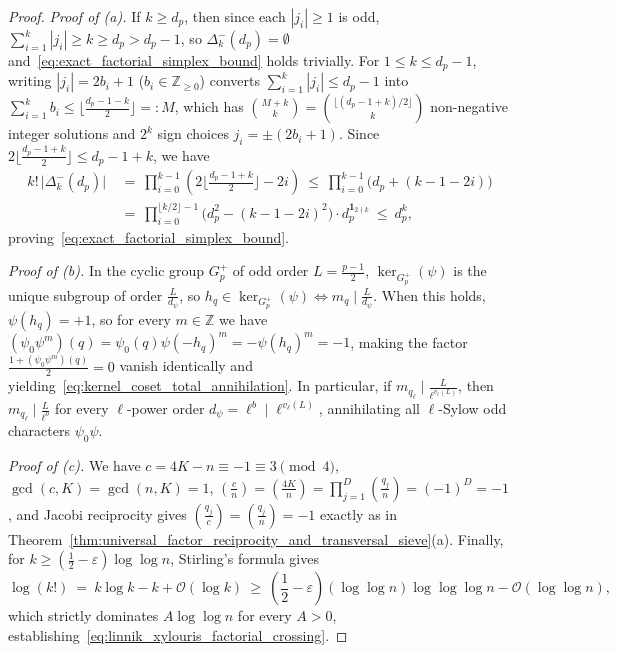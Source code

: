 \documentclass[11pt, a4paper]{article}
\theoremstyle{plain}
\theoremstyle{definition}
\newcommand{\Z}{\mathbb{Z}}
\newcommand{\leg}[2]{\left(\frac{#1}{#2}\right)}
\begin{document}
\begin{proof}
\emph{Proof of (a).} If $k\ge d_p$, then since each $|j_i|\ge1$ is odd, $\sum_{i=1}^{k}|j_i|\ge k\ge d_p>d_p-1$, so $\Delta_k^{-}(d_p)=\emptyset$ and~\eqref{eq:exact_factorial_simplex_bound} holds trivially. For $1\le k\le d_p-1$, writing $|j_i|=2b_i+1$ ($b_i\in\Z_{\ge0}$) converts $\sum_{i=1}^{k}|j_i|\le d_p-1$ into $\sum_{i=1}^{k}b_i\le\big\lfloor\frac{d_p-1-k}{2}\big\rfloor=:M$, which has $\binom{M+k}{k}=\binom{\lfloor(d_p-1+k)/2\rfloor}{k}$ non-negative integer solutions and $2^{k}$ sign choices $j_i=\pm(2b_i+1)$. Since $2\lfloor\frac{d_p-1+k}{2}\rfloor\le d_p-1+k$, we have
\[
\begin{aligned}
k!\,\big|\Delta_k^{-}(d_p)\big|\ &=\ \prod_{i=0}^{k-1}\left(2\Big\lfloor\frac{d_p-1+k}{2}\Big\rfloor-2i\right)\ \le\ \prod_{i=0}^{k-1}\big(d_p+(k-1-2i)\big)\\
&=\ \prod_{i=0}^{\lfloor k/2\rfloor-1}\Big(d_p^{2}-(k-1-2i)^{2}\Big)\cdot d_p^{\mathbf{1}_{2\nmid k}}\ \le\ d_p^{k},
\end{aligned}
\]
proving~\eqref{eq:exact_factorial_simplex_bound}.

\medskip\noindent\emph{Proof of (b).} In the cyclic group $G_p^{+}$ of odd order $L=\frac{p-1}{2}$, $\ker_{G_p^{+}}(\psi)$ is the unique subgroup of order $\frac{L}{d_{\psi}}$, so $h_q\in\ker_{G_p^{+}}(\psi)\iff m_q\mid\frac{L}{d_{\psi}}$. When this holds, $\psi(h_q)=+1$, so for every $m\in\Z$ we have $(\psi_0\psi^{m})(q)=\psi_0(q)\psi(-h_q)^{m}=-\psi(h_q)^{m}=-1$, making the factor $\frac{1+(\psi_0\psi^{m})(q)}{2}=0$ vanish identically and yielding~\eqref{eq:kernel_coset_total_annihilation}. In particular, if $m_{q_{\ell}}\mid\frac{L}{\ell^{v_{\ell}(L)}}$, then $m_{q_{\ell}}\mid\frac{L}{\ell^{b}}$ for every $\ell$-power order $d_{\psi}=\ell^{b}\mid\ell^{v_{\ell}(L)}$, annihilating all $\ell$-Sylow odd characters $\psi_0\psi$.

\medskip\noindent\emph{Proof of (c).} We have $c=4K-n\equiv-1\equiv3\pmod 4$, $\gcd(c,K)=\gcd(n,K)=1$, $\leg{c}{n}=\leg{4K}{n}=\prod_{j=1}^{D}\leg{q_j}{n}=(-1)^{D}=-1$, and Jacobi reciprocity gives $\leg{q_j}{c}=\leg{q_j}{n}=-1$ exactly as in Theorem~\ref{thm:universal_factor_reciprocity_and_transversal_sieve}(a). Finally, for $k\ge(\frac12-\varepsilon)\log\log n$, Stirling's formula gives
\[
\log(k!)\ =\ k\log k-k+\mathcal{O}(\log k)\ \ge\ \left(\frac12-\varepsilon\right)(\log\log n)\log\log\log n-\mathcal{O}(\log\log n),
\]
which strictly dominates $A\log\log n$ for every $A>0$, establishing~\eqref{eq:linnik_xylouris_factorial_crossing}.


\end{proof}
\end{document}
